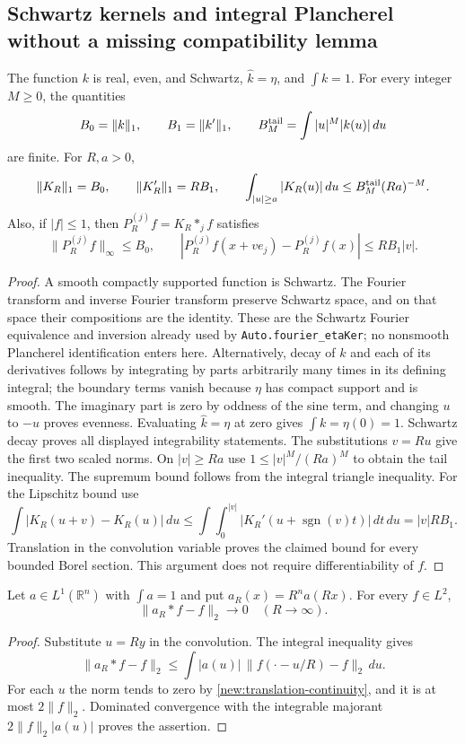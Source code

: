 \documentclass[11pt]{article}
\theoremstyle{definition}
\newcommand{\pid}[1]{\nolinkurl{#1}}
\newcommand{\R}{\mathbb R}
\begin{document}
\subsection{Schwartz kernels and integral Plancherel without a missing compatibility lemma}
\begin{lemma}\label{new:kernel-facts}
The function $k$ is real, even, and Schwartz, $\widehat k=\eta$, and $\int k=1$.
For every integer $M\geq0$, the quantities
\[
 B_0=\|k\|_1,\qquad B_1=\|k'\|_1,\qquad
 B_M^{\rm tail}=\int |u|^M|k(u)|\,du
\]
are finite. For $R,a>0$,
\[
 \|K_R\|_1=B_0,\qquad \|K_R'\|_1=RB_1,
 \qquad \int_{|u|\geq a}|K_R(u)|\,du\leq B_M^{\rm tail}(Ra)^{-M}.
\]
Also, if $|f|\leq1$, then $P_R^{(j)}f=K_R*_{j}f$ satisfies
\[
 \|P_R^{(j)}f\|_\infty\leq B_0,
 \qquad |P_R^{(j)}f(x+ve_j)-P_R^{(j)}f(x)|\leq RB_1|v|.
\]
\end{lemma}
\begin{proof}
A smooth compactly supported function is Schwartz. The Fourier transform and inverse
Fourier transform preserve Schwartz space, and on that space their compositions are the
identity. These are the Schwartz Fourier equivalence and inversion already used by
\pid{Auto.fourier_etaKer}; no nonsmooth Plancherel identification enters here.
Alternatively, decay of $k$ and each of its derivatives follows by integrating by parts
arbitrarily many times in its defining integral; the boundary terms vanish because $\eta$
has compact support and is smooth. The imaginary part is zero by oddness of the sine term,
and changing $u$ to $-u$ proves evenness. Evaluating $\widehat k=\eta$ at zero gives
$\int k=\eta(0)=1$. Schwartz decay proves all displayed integrability statements.
The substitutions $v=Ru$ give the first two scaled norms. On $|v|\geq Ra$ use
$1\leq |v|^M/(Ra)^M$ to obtain the tail inequality. The supremum bound follows from the
integral triangle inequality. For the Lipschitz bound use
\[
 \int|K_R(u+v)-K_R(u)|\,du
 \leq\int\!\int_0^{|v|}|K_R'(u+\operatorname{sgn}(v)t)|\,dt\,du
 =|v|RB_1.
\]
Translation in the convolution variable proves the claimed bound for every bounded Borel
section. This argument does not require differentiability of $f$.
\end{proof}

\begin{lemma}\label{new:approximate-identity}
Let $a\in L^1(\R^n)$ with $\int a=1$ and put $a_R(x)=R^na(Rx)$. For every $f\in L^2$,
\[
 \|a_R*f-f\|_2\longrightarrow0\quad(R\longrightarrow\infty).
\]
\end{lemma}
\begin{proof}
Substitute $u=Ry$ in the convolution. The integral inequality gives
\[
 \|a_R*f-f\|_2\leq\int|a(u)|\,\|f(\cdot-u/R)-f\|_2\,du.
\]
For each $u$ the norm tends to zero by \cref{new:translation-continuity}, and it is at most
$2\|f\|_2$. Dominated convergence with the integrable majorant
$2\|f\|_2|a(u)|$ proves the assertion.
\end{proof}
\end{document}
